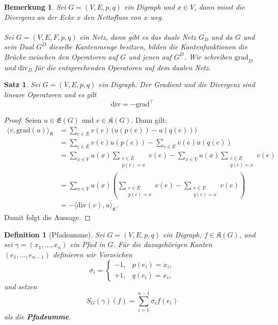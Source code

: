 \documentclass[11pt,a4paper,leqno]{report}
\newtheorem{proposition}{Satz}[chapter]
\newtheorem{definition}[theorem]{Definition}
\newtheorem{remark}[theorem]{Bemerkung}
\numberwithin{equation}{chapter}
\begin{document}
\begin{remark}
	Sei $G=(V,E, p, q)$ ein Digraph und $x \in V$, dann misst die Divergenz an der Ecke $x$ den Nettofluss von $x$ weg.
	\\
	\\
	Sei $G=(V,E, F, p, q)$ ein Netz, dann gibt es das duale Netz $G_D$ und da $G$ und sein Dual $G^D$ dieselbe Kantenmenge besitzen, bilden die Kantenfunktionen die Brücke zwischen den Operatoren auf $G$ und jenen auf $G^D$. Wir schreiben $\mathrm{grad}_D$ und $\mathrm{div}_D$ für die entsprechenden Operatoren auf dem dualen Netz. 
\end{remark}
\begin{proposition}\label{prop:adj_div_grad}
	Sei $G=(V,E, p, q)$ ein Digraph. Der Gradient und die Divergenz sind lineare Operatoren und es gilt
	\[
	\mathrm{div} = - \mathrm{grad}^\top
	\]
\end{proposition}
\begin{proof}
	Seien $u \in \mathfrak{E}(G)$ und $v \in \mathfrak{K}(G)$. Dann gilt:
	\begin{align*}
		\langle v, \mathrm{grad}(u)\rangle_{\mathfrak{K}}
		&= \sum_{e\in E} v(e)\,\bigl(u(p(e)) - u(q(e))\bigr) \\
		&= \sum_{e\in E} v(e) u(p(e)) - \sum_{e\in E} v(e) u(q(e))\\
		&= \sum_{x\in V} u(x) \sum_{\substack{e\in E \\ p(e)=x}}v(e) - \sum_{x\in V} u(x) \sum_{\substack{e\in E \\ q(e)=x}}v(e)\\
		&= \sum_{x\in V} u(x) \left( \sum_{\substack{e\in E \\ p(e)=x}} v(e) - \sum_{\substack{e\in E \\ q(e)=x}} v(e)\right) \\
		&= - \langle \mathrm{div}(v), u\rangle_{\mathfrak{E}}.
	\end{align*}
	Damit folgt die Aussage.
\end{proof}
\begin{definition}[Pfadsumme]
	Sei $G=(V,E,p,q)$ ein Digraph, $f \in \mathfrak{K}(G)$, und sei
	$\gamma=(x_1,\dots, x_n)$ ein Pfad in $G$. 
	Für die dazugehörigen Kanten $(e_1,\dots, e_{n-1})$ definieren wir Vorzeichen
	\[
	\sigma_i = \begin{cases}
		-1, & p(e_i)=x_i,\\
		+1, & q(e_i)=x_i,
	\end{cases}
	\]
	und setzen
	\[
	S_G(\gamma)(f)=\sum_{i=1}^{n-1}\sigma_i f(e_i)
	\]
	als die \textbf{Pfadsumme}.
\end{definition}
\end{document}
